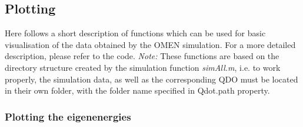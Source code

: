 \subsection{Plotting}
	Here follows a short description of functions which can be used for basic visualisation of the data obtained by the OMEN simulation. 
	For a more detailed description, please refer to the code.
	\textit{Note:}
	These functions are based on the directory structure created by the simulation function \textit{simAll.m}, i.e. to work properly, the simulation data, 
	as well as the corresponding QDO must be located in their own folder, with the folder name specified in Qdot.path property.
	\subsubsection{Plotting the eigenenergies}

